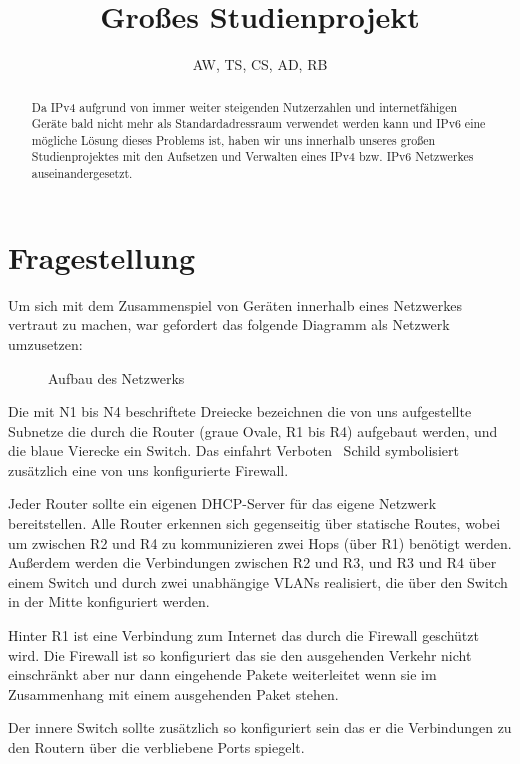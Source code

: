 \documentclass[10pt,a4paper]{article}
\author{AW, TS, CS, AD, RB}
\title{Großes Studienprojekt}
\begin{document}
\maketitle
\begin{abstract}
  Da IPv4 aufgrund von immer weiter steigenden Nutzerzahlen
  und internetfähigen Geräte bald nicht mehr als
  Standardadressraum verwendet werden kann und IPv6 eine
  mögliche Lösung dieses Problems ist, haben wir uns innerhalb
  unseres großen Studienprojektes mit den Aufsetzen und
  Verwalten eines IPv4 bzw. IPv6 Netzwerkes
  auseinandergesetzt.
\end{abstract}
\section{Fragestellung}
Um sich mit dem Zusammenspiel von Geräten innerhalb eines
Netzwerkes vertraut zu machen, war gefordert das folgende
Diagramm als Netzwerk umzusetzen:
\begin{figure}[ht]
  \centering
  \caption{Aufbau des Netzwerks}
\end{figure}
\par
Die mit N1 bis N4 beschriftete Dreiecke bezeichnen die von uns
aufgestellte Subnetze die durch die Router (graue Ovale, R1 bis R4)
aufgebaut werden, und die blaue Vierecke ein Switch. Das \glqq
einfahrt Verboten\grqq~ Schild symbolisiert zusätzlich eine von uns
konfigurierte Firewall.
\par
Jeder Router sollte ein eigenen DHCP-Server für das eigene Netzwerk
bereitstellen. Alle Router erkennen sich gegenseitig über statische
Routes, wobei um zwischen R2 und R4 zu kommunizieren zwei Hops (über
R1) benötigt werden. Außerdem werden die Verbindungen zwischen R2 und
R3, und R3 und R4 über einem Switch und durch zwei unabhängige VLANs
realisiert, die über den Switch in der Mitte konfiguriert werden.
\par
Hinter R1 ist eine Verbindung zum Internet das durch die Firewall
geschützt wird. Die Firewall ist so konfiguriert das sie den
ausgehenden Verkehr nicht einschränkt aber nur dann eingehende Pakete
weiterleitet wenn sie im Zusammenhang mit einem ausgehenden Paket
stehen.
\par
Der innere Switch sollte zusätzlich so konfiguriert sein das er die
Verbindungen zu den Routern über die verbliebene Ports spiegelt.
\end{document}
